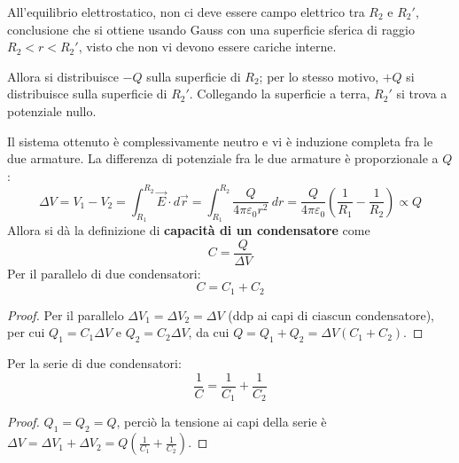 \documentclass[a4paper]{scrartcl}
\numberwithin{equation}{subsection}
\theoremstyle{style1}
\newenvironment{boxenv}[1][]{
    \begin{eqbox}[#1]
    }{
   \end{eqbox}
}
\begin{document}
All'equilibrio elettrostatico, non ci deve essere campo elettrico tra $R_2$ e $R_2'$, conclusione che si ottiene usando Gauss con una superficie sferica di raggio $R_2 < r<R_2'$, visto che non vi devono essere cariche interne.

Allora si distribuisce $-Q$ sulla superficie di $R_2$; per lo stesso motivo, $+Q$ si distribuisce sulla superficie di $R_2'$. Collegando la superficie a terra, $R_2'$ si trova a potenziale nullo. 

Il sistema ottenuto \`e complessivamente neutro e vi \`e induzione completa fra le due armature. La differenza di potenziale fra le due armature \`e proporzionale a $Q$:
\begin{equation}
	\Delta V = V_1 - V_2 = \int_{R_1} ^{R_{2} } \vec{E}\cdot d\vec{r}  = \int_{R_1} ^{R_2} \frac{Q}{4\pi \varepsilon _0 r^2}\ dr = \frac{Q}{4\pi \varepsilon _0}\left(\frac{1}{R_1}- \frac{1}{R_{2} }\right) \propto Q 
\end{equation}
Allora si d\`a la definizione di \textbf{capacit\`a di un condensatore} come 
\begin{equation}
	C = \frac{Q}{\Delta V}
\end{equation}
Per il parallelo di due condensatori:
\begin{equation}
	C = C_1 + C_2
\end{equation}
\begin{boxenv}[]
\begin{proof}
	Per il parallelo $\Delta V_1 = \Delta V_2 = \Delta V$ (ddp ai capi di ciascun condensatore), per cui $Q_1=C_1\Delta V$ e $Q_2 = C_2 \Delta V$, da cui $Q = Q_1+Q_2 = \Delta V(C_1+C_2)$.
\end{proof}
\end{boxenv}
Per la serie di due condensatori:
\begin{equation}
	\frac{1}{C} = \frac{1}{C_1}+\frac{1}{C_2}
\end{equation}
\begin{boxenv}
\begin{proof}
	$Q_1=Q_2=Q$, perci\`o la tensione ai capi della serie \`e $\Delta V= \Delta V_1 + \Delta V_2= Q \left(\frac{1}{C_1}+\frac{1}{C_2}\right) $.
\end{proof}
\end{boxenv}
\end{document}
